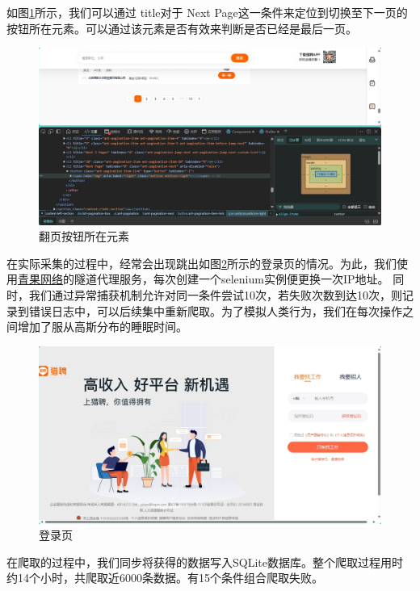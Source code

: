 如图\ref{nextpage}所示，我们可以通过 title对于 Next Page这一条件来定位到切换至下一页的按钮所在元素。可以通过该元素是否有效来判断是否已经是最后一页。

\begin{figure}[!htbp]
    \centering
    \includegraphics[width=\textwidth]{figures/nextpage.png}
    \caption{翻页按钮所在元素}\label{nextpage}
\end{figure}

在实际采集的过程中，经常会出现跳出如图\ref{login}所示的登录页的情况。为此，我们使用\href{www.qg.net}{青果网络}的隧道代理服务，每次创建一个selenium实例便更换一次IP地址。
同时，我们通过异常捕获机制允许对同一条件尝试10次，若失败次数到达10次，则记录到错误日志中，可以后续集中重新爬取。为了模拟人类行为，我们在每次操作之间增加了服从高斯分布的睡眠时间。

\begin{figure}[!htbp]
    \centering
    \includegraphics[width=\textwidth]{figures/login.png}
    \caption{登录页}\label{login}
\end{figure}

在爬取的过程中，我们同步将获得的数据写入SQLite数据库。整个爬取过程用时约14个小时，共爬取近6000条数据。有15个条件组合爬取失败。

